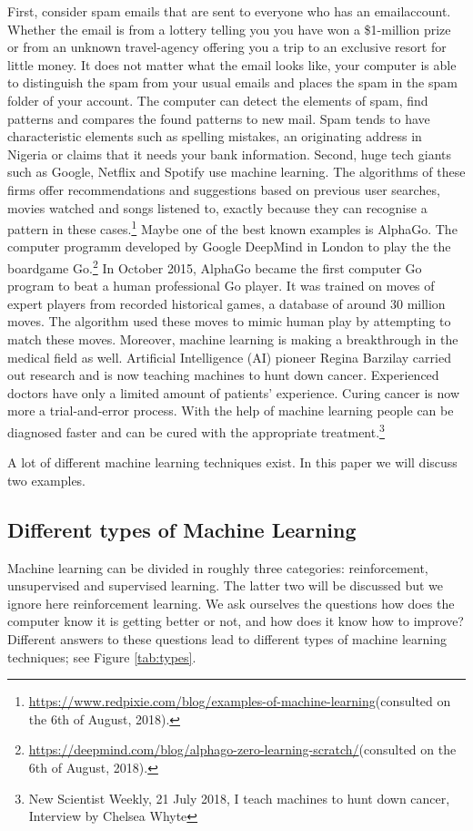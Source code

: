 \documentclass[11pt]{article}
\begin{document}
First, consider spam emails that are sent to everyone who has an emailaccount. Whether the email is from a lottery telling you you have won a \$1-million prize or from an unknown travel-agency offering you a trip to an exclusive resort for little money. It does not matter what the email looks like, your computer is able to distinguish the spam from your usual emails and places the spam in the spam folder of your account. The computer can detect the elements of spam, find patterns and compares the found patterns to new mail. Spam tends to have characteristic elements such as spelling mistakes, an originating address in Nigeria or claims that it needs your bank information. Second, huge tech giants such as Google, Netflix and Spotify use machine learning. The algorithms of these firms offer recommendations and suggestions based on previous user searches, movies watched and songs listened to, exactly because they can recognise a pattern in these cases.\footnote{\url{https://www.redpixie.com/blog/examples-of-machine-learning}(consulted on the 6th of August, 2018).} Maybe one of the best known examples is AlphaGo. The computer programm developed by Google DeepMind in London to play the the boardgame Go.\footnote{\url{https://deepmind.com/blog/alphago-zero-learning-scratch/}(consulted on the 6th of August, 2018).} In October 2015, AlphaGo became the first computer Go program to beat a human professional Go player. It was trained on moves of expert players from recorded historical games, a database of around 30 million moves. The algorithm used these moves to mimic human play by attempting to match these moves. Moreover, machine learning is making a breakthrough in the medical field as well. Artificial Intelligence (AI) pioneer Regina Barzilay carried out research and is now teaching machines to hunt down cancer. Experienced doctors have only a limited amount of patients' experience. Curing cancer is now more a trial-and-error process. With the help of machine learning people can be diagnosed faster and can be cured with the appropriate treatment.\footnote{New Scientist Weekly, 21 July 2018, I teach machines to hunt down cancer, Interview by Chelsea Whyte}   

A lot of different machine learning techniques exist. In this paper we will discuss two examples.


\subsection{Different types of Machine Learning}
\label{sec:orgc2e59e0}
Machine learning can be divided in roughly three categories: reinforcement, unsupervised and supervised learning. The latter two will be discussed but we ignore here reinforcement learning. We ask ourselves the questions how does the computer know it is getting better or not, and how does it know how to improve? Different answers to these questions lead to different types of machine learning techniques; see Figure \ref{tab:types}. 
\end{document}
